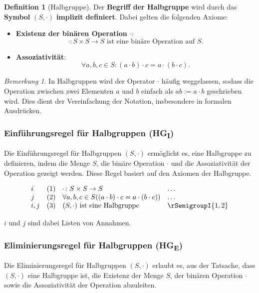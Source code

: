 \documentclass{book}
\theoremstyle{plain}
\theoremstyle{remark}
\newtheorem*{remark}{Bemerkung}
\theoremstyle{definition}
\newtheorem{definition}{Definition}[section]
\begin{document}
\begin{definition}[Halbgruppe]
    Der \textbf{Begriff der Halbgruppe} wird durch das \textbf{Symbol} \((S, \cdot)\) \textbf{implizit definiert}. Dabei gelten die folgenden Axiome:
    
    \begin{itemize}
     
        \item \textbf{Existenz der binären Operation \(\cdot\)}:
        \[
        \cdot \colon S \times S \to S \text{ ist eine binäre Operation auf } S.
        \]
        
        \item \textbf{Assoziativität}: 
        \[
        \forall a, b, c \in S \colon (a \cdot b) \cdot c = a \cdot (b \cdot c).
        \]
    \end{itemize}
\end{definition}
\begin{remark}
    In Halbgruppen wird der Operator \(\cdot\) häufig weggelassen, sodass die Operation zwischen zwei Elementen \(a\) und \(b\) einfach als \(ab:=a\cdot b\) geschrieben wird. Dies dient der Vereinfachung der Notation, insbesondere in formalen Ausdrücken.
\end{remark}

\subsubsection*{Einführungsregel für Halbgruppen (HG\textsubscript{I})}
\label{rule:rSemigroupI}
Die Einführungsregel für Halbgruppen \((S, \cdot)\) ermöglicht es, eine Halbgruppe zu definieren, indem die Menge \(S\), die binäre Operation \(\cdot\) und die Assoziativität der Operation gezeigt werden. Diese Regel basiert auf den Axiomen der Halbgruppe.

\[
\begin{array}{llll}
    i       & (1) & \cdot \colon S \times S \to S & \dots \\
    j       & (2) & \forall a, b, c \in S ((a \cdot b) \cdot c = a \cdot (b \cdot c)) & \dots \\
    i,j     & (3) & (S, \cdot) \text{ ist eine Halbgruppe} & \rSemigroupI{1,2}
\end{array}
\]

\(i\) und \(j\) sind dabei Listen von Annahmen.

\subsubsection*{Eliminierungsregel für Halbgruppen (HG\textsubscript{E})}
\label{rule:rSemigroupE}
Die Eliminierungsregel für Halbgruppen \((S, \cdot)\) erlaubt es, aus der Tatsache, dass \((S, \cdot)\) eine Halbgruppe ist, die Existenz der Menge \(S\), der binären Operation \(\cdot\) sowie die Assoziativität der Operation abzuleiten.
\end{document}
